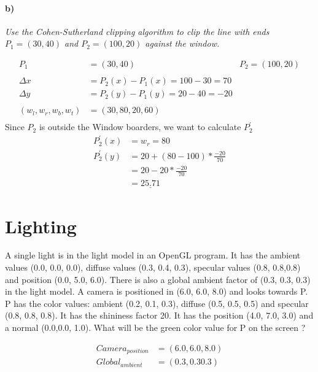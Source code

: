 \documentclass[12pt,fleqn,reqno]{article}
\begin{document}
\paragraph{b)}
\emph{Use the Cohen-Sutherland clipping algorithm to clip the line with ends \(P_1=(30, 40)\) and \(P_2=(100, 20)\) against the window.}


\begin{alignat*}{2}
	P_1 		&= (30,40) &P_2 = (100,20)\\
	\\
	\Delta x 	&= P_2(x) - P_1(x) = 100 -30 = 70\\
	\Delta y	&= P_2(y) - P_1(y) = 20 -40 = -20 \\
	\\
	(w_l,w_r,w_b,w_t) &= (30,80,20,60)\\
\end{alignat*}
Since \(P_2\) is outside the Window boarders, we want to calculate \( P_{2}^{'} \)
\begin{alignat*}{2}
	 P_{2}^{'}(x) &= w_r = 80\\
	 P_{2}^{'}(y) &= 20 + (80 -100) * \frac{-20}{70}\\
	  	&= 20 - 20 *  \frac{-20}{70}\\
		&=  \underline{25.71}
\end{alignat*}

\section{Lighting}
A single light is in the light model in an OpenGL program. It has the ambient values (0.0, 0.0, 0.0), diffuse values (0.3, 0.4, 0.3), specular values (0.8, 0.8,0.8) and position (0.0, 5.0, 6.0). There is also a global ambient factor of (0.3, 0.3, 0.3) in the light model.
A camera is positioned in (6.0, 6.0, 8.0) and looks towards P.
P has the color values:
ambient (0.2, 0.1, 0.3), diffuse (0.5, 0.5, 0.5) and specular (0.8, 0.8, 0.8). It has the shininess factor 20. It has the position (4.0, 7.0, 3.0) and a normal (0.0,0.0, 1.0).
What will be the green color value for P on the screen ?
\begin{multicols}{2}
\begin{alignat*}{2}
Camera_{position}	&= (6.0, 6.0, 8.0) \\
	Global_{ambient}	&= (0.3, 0.3 0.3) \\
\end{alignat*}
\end{multicols}
\end{document}
